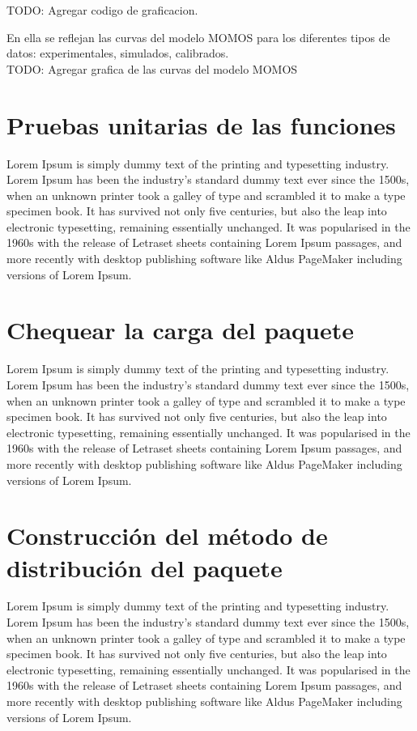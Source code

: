 TODO: Agregar codigo de graficacion.

En ella se reflejan las curvas del modelo MOMOS para los diferentes tipos de datos: experimentales, simulados, calibrados.\\

TODO: Agregar grafica de las curvas del modelo MOMOS
\section{Pruebas unitarias de las funciones}

Lorem Ipsum is simply dummy text of the printing and typesetting industry. Lorem Ipsum has been the industry's standard dummy text ever since the 1500s, when an unknown printer took a galley of type and scrambled it to make a type specimen book. It has survived not only five centuries, but also the leap into electronic typesetting, remaining essentially unchanged. It was popularised in the 1960s with the release of Letraset sheets containing Lorem Ipsum passages, and more recently with desktop publishing software like Aldus PageMaker including versions of Lorem Ipsum.

\section{Chequear la carga del paquete}

Lorem Ipsum is simply dummy text of the printing and typesetting industry. Lorem Ipsum has been the industry's standard dummy text ever since the 1500s, when an unknown printer took a galley of type and scrambled it to make a type specimen book. It has survived not only five centuries, but also the leap into electronic typesetting, remaining essentially unchanged. It was popularised in the 1960s with the release of Letraset sheets containing Lorem Ipsum passages, and more recently with desktop publishing software like Aldus PageMaker including versions of Lorem Ipsum.

\section{Construcci\'on del m\'etodo de distribuci\'on del paquete}

Lorem Ipsum is simply dummy text of the printing and typesetting industry. Lorem Ipsum has been the industry's standard dummy text ever since the 1500s, when an unknown printer took a galley of type and scrambled it to make a type specimen book. It has survived not only five centuries, but also the leap into electronic typesetting, remaining essentially unchanged. It was popularised in the 1960s with the release of Letraset sheets containing Lorem Ipsum passages, and more recently with desktop publishing software like Aldus PageMaker including versions of Lorem Ipsum.
